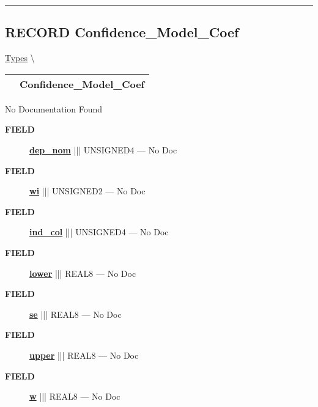\rule{\linewidth}{0.5pt}
\subsection*{\textsf{\colorbox{headtoc}{\color{white} RECORD}
Confidence\_Model\_Coef}}

\hypertarget{ecldoc:logisticregression.types.confidence_model_coef}{}
\hspace{0pt} \hyperlink{ecldoc:LogisticRegression.Types}{Types} \textbackslash 

{\renewcommand{\arraystretch}{1.5}
\begin{tabularx}{\textwidth}{|>{\raggedright\arraybackslash}l|X|}
\hline
\hspace{0pt}\mytexttt{\color{red} } & \textbf{Confidence\_Model\_Coef} \\
\hline
\end{tabularx}
}

\par





No Documentation Found







\par
\begin{description}
\item [\colorbox{tagtype}{\color{white} \textbf{\textsf{FIELD}}}] \textbf{\underline{dep\_nom}} ||| UNSIGNED4 --- No Doc
\item [\colorbox{tagtype}{\color{white} \textbf{\textsf{FIELD}}}] \textbf{\underline{wi}} ||| UNSIGNED2 --- No Doc
\item [\colorbox{tagtype}{\color{white} \textbf{\textsf{FIELD}}}] \textbf{\underline{ind\_col}} ||| UNSIGNED4 --- No Doc
\item [\colorbox{tagtype}{\color{white} \textbf{\textsf{FIELD}}}] \textbf{\underline{lower}} ||| REAL8 --- No Doc
\item [\colorbox{tagtype}{\color{white} \textbf{\textsf{FIELD}}}] \textbf{\underline{se}} ||| REAL8 --- No Doc
\item [\colorbox{tagtype}{\color{white} \textbf{\textsf{FIELD}}}] \textbf{\underline{upper}} ||| REAL8 --- No Doc
\item [\colorbox{tagtype}{\color{white} \textbf{\textsf{FIELD}}}] \textbf{\underline{w}} ||| REAL8 --- No Doc
\end{description}





